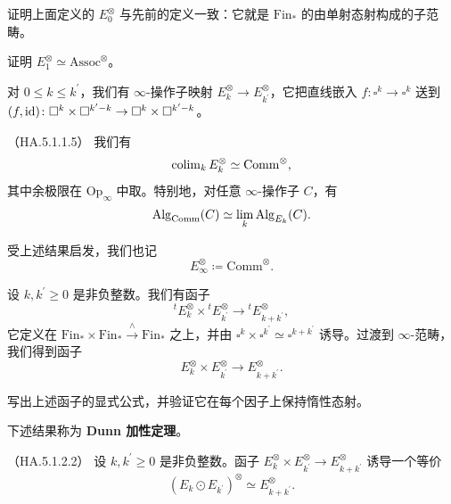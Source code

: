 \begin{exercise}\label{L26-4.4}
证明上面定义的 $E_{0}^{\otimes}$ 与先前的定义一致：它就是 $\mathrm{Fin}_{*}$ 的由单射态射构成的子范畴。
\end{exercise}

\begin{exercise}\label{L26-4.5}
证明 $E_{1}^{\otimes}\simeq\mathrm{Assoc}^{\otimes}$。
\end{exercise}

\nitem\label{L26-4.6} 对 $0\le k\le k^{\prime}$，我们有 $\infty$-操作子映射 $E_{k}^{\otimes}\to E_{k^{\prime}}^{\otimes}$，它把直线嵌入 $f\colon\square^{k}\to\square^{k}$ 送到 $(f,\operatorname{id})\colon\square^{k}\times\square^{k^{\prime}-k}\to\square^{k}\times\square^{k^{\prime}-k}$。

\begin{proposition}\label{L26-4.7}（HA.5.1.1.5）
我们有
\[
\operatorname{colim}_{k}E_{k}^{\otimes}\simeq\mathrm{Comm}^{\otimes},
\]
其中余极限在 $\mathrm{Op}_{\infty}$ 中取。特别地，对任意 $\infty$-操作子 $C$，有
\[
\operatorname{Alg}_{\mathrm{Comm}}(C)\simeq\lim_{k}\operatorname{Alg}_{E_{k}}(C).
\]
\end{proposition}

\nitem\label{L26-4.8} 受上述结果启发，我们也记
\[
E_{\infty}^{\otimes}\coloneqq\mathrm{Comm}^{\otimes}.
\]

\begin{construction}\label{L26-4.9}
设 $k,k^{\prime}\ge0$ 是非负整数。我们有函子
\[
{}^{t}E_{k}^{\otimes}\times{}^{t}E_{k^{\prime}}^{\otimes}\to{}^{t}E_{k+k^{\prime}}^{\otimes},
\]
它定义在 $\mathrm{Fin}_{*}\times\mathrm{Fin}_{*}\xrightarrow{\wedge}\mathrm{Fin}_{*}$ 之上，并由 $\square^{k}\times\square^{k^{\prime}}\simeq\square^{k+k^{\prime}}$ 诱导。过渡到 $\infty$-范畴，我们得到函子
\[
E_{k}^{\otimes}\times E_{k^{\prime}}^{\otimes}\to E_{k+k^{\prime}}^{\otimes}.
\]
\end{construction}

\begin{exercise}\label{L26-4.10}
写出上述函子的显式公式，并验证它在每个因子上保持惰性态射。
\end{exercise}

\nitem\label{L26-4.11} 下述结果称为 \textbf{Dunn 加性定理}。

\begin{theorem}\label{L26-4.12}（HA.5.1.2.2）
设 $k,k^{\prime}\ge0$ 是非负整数。函子 $E_{k}^{\otimes}\times E_{k^{\prime}}^{\otimes}\to E_{k+k^{\prime}}^{\otimes}$ 诱导一个等价
\[
(E_{k}\odot E_{k^{\prime}})^{\otimes}\simeq E_{k+k^{\prime}}^{\otimes}.
\]
\end{theorem}

